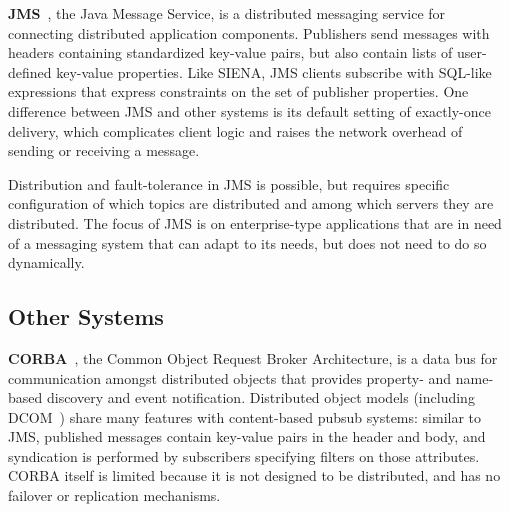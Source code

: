 \textbf{JMS}~\cite{hapner2002java}, the Java Message Service, is a distributed messaging service for connecting distributed application components.
Publishers send messages with headers containing standardized key-value pairs, but also contain lists of user-defined key-value properties.
Like SIENA, JMS clients subscribe with SQL-like expressions that express constraints on the set of publisher properties.
One difference between JMS and other systems is its default setting of exactly-once delivery, which complicates client logic and raises the network overhead of sending or receiving a message.

Distribution and fault-tolerance in JMS is possible, but requires specific configuration of which topics are distributed and among which servers they are distributed.
The focus of JMS is on enterprise-type applications that are in need of a messaging system that can adapt to its needs, but does not need to do so dynamically.


\subsection{Other Systems}

\textbf{CORBA}~\cite{vinoski1997corba}, the Common Object Request Broker Architecture, is a data bus for communication amongst distributed objects that provides property- and name-based discovery and event notification.
Distributed object models (including DCOM~\cite{horstmann1997dcom}) share many features with content-based pubsub systems: similar to JMS, published messages contain key-value pairs in the header and body, and syndication is performed by subscribers specifying filters on those attributes.
CORBA itself is limited because it is not designed to be distributed, and has no failover or replication mechanisms.
